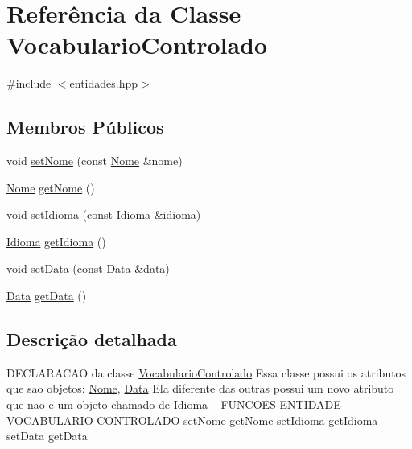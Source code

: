 \hypertarget{class_vocabulario_controlado}{}\section{Referência da Classe Vocabulario\+Controlado}
\label{class_vocabulario_controlado}


{\ttfamily \#include $<$entidades.\+hpp$>$}

\subsection*{Membros Públicos}
\begin{DoxyCompactItemize}
\item 
void \mbox{\hyperlink{class_vocabulario_controlado_ad6b399616083d302dc6b4571561dc3a1}{set\+Nome}} (const \mbox{\hyperlink{class_nome}{Nome}} \&nome)
\item 
\mbox{\hyperlink{class_nome}{Nome}} \mbox{\hyperlink{class_vocabulario_controlado_a72f075ee1ae0d9179694ee51de012c2b}{get\+Nome}} ()
\item 
void \mbox{\hyperlink{class_vocabulario_controlado_ab8b9dba88aaead783d012ed7254859ba}{set\+Idioma}} (const \mbox{\hyperlink{class_idioma}{Idioma}} \&idioma)
\item 
\mbox{\hyperlink{class_idioma}{Idioma}} \mbox{\hyperlink{class_vocabulario_controlado_a2e0874c520bf06a8add2bb1ef6e97e84}{get\+Idioma}} ()
\item 
void \mbox{\hyperlink{class_vocabulario_controlado_ad59afd1d3c7e7187597cc0b61dd26328}{set\+Data}} (const \mbox{\hyperlink{class_data}{Data}} \&data)
\item 
\mbox{\hyperlink{class_data}{Data}} \mbox{\hyperlink{class_vocabulario_controlado_a20ecccfef3603c0b4e098664da1c4715}{get\+Data}} ()
\end{DoxyCompactItemize}


\subsection{Descrição detalhada}
D\+E\+C\+L\+A\+R\+A\+C\+AO da classe \mbox{\hyperlink{class_vocabulario_controlado}{Vocabulario\+Controlado}} Essa classe possui os atributos que sao objetos\+: \mbox{\hyperlink{class_nome}{Nome}}, \mbox{\hyperlink{class_data}{Data}} Ela diferente das outras possui um novo atributo que nao e um objeto chamado de \mbox{\hyperlink{class_idioma}{Idioma}} ~\newline
F\+U\+N\+C\+O\+ES E\+N\+T\+I\+D\+A\+DE V\+O\+C\+A\+B\+U\+L\+A\+R\+IO C\+O\+N\+T\+R\+O\+L\+A\+DO set\+Nome get\+Nome set\+Idioma get\+Idioma set\+Data get\+Data 

